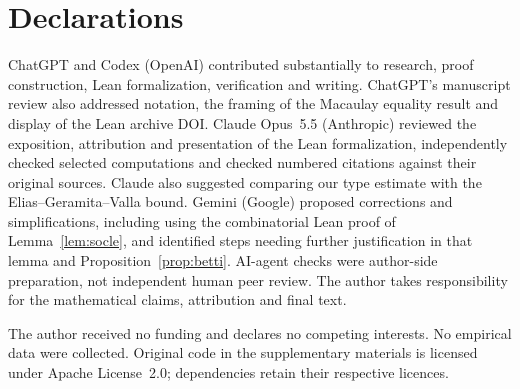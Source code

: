 \documentclass[11pt]{article}
\theoremstyle{definition}
\theoremstyle{remark}
\theoremstyle{plain}
\begin{document}
\section*{Declarations}
ChatGPT and Codex (OpenAI) contributed substantially to research,
proof construction, Lean formalization, verification and writing.
ChatGPT's manuscript review also addressed notation, the framing of
the Macaulay equality result and display of the Lean archive DOI.
Claude Opus~5.5 (Anthropic) reviewed the exposition, attribution and
presentation of the Lean formalization, independently checked selected
computations and checked numbered citations against their original
sources. Claude also suggested comparing our type estimate with the
Elias--Geramita--Valla bound. Gemini (Google) proposed corrections and
simplifications, including using the combinatorial Lean proof of
Lemma~\ref{lem:socle}, and identified steps needing further justification
in that lemma and Proposition~\ref{prop:betti}.
AI-agent checks were author-side preparation,
not independent human peer review. The author takes responsibility for the mathematical claims, attribution
and final text.

The author received no funding and declares no competing interests.
No empirical data were collected. Original code in the supplementary
materials is licensed under Apache License~2.0; dependencies retain
their respective licences.
\end{document}

